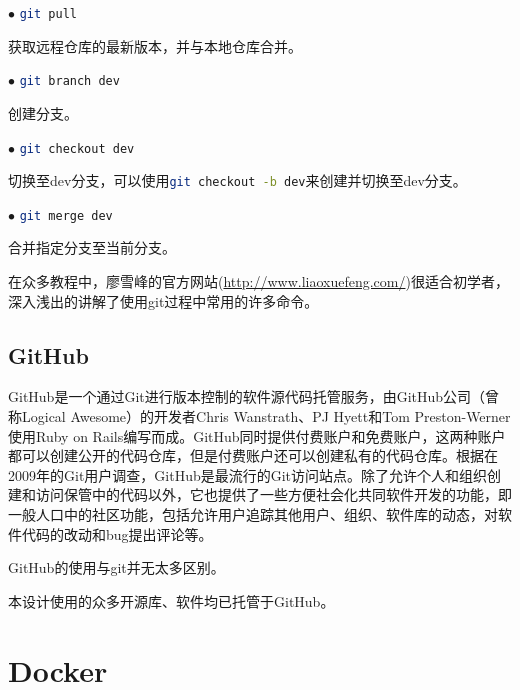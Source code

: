 			\par $\bullet$ \lstinline[language=sh]{git pull}
			\par 获取远程仓库的最新版本，并与本地仓库合并。
			\par $\bullet$ \lstinline[language=sh]{git branch dev}
			\par 创建分支。
			\par $\bullet$ \lstinline[language=sh]{git checkout dev}
			\par 切换至dev分支，可以使用\lstinline[language=sh]{git checkout -b dev}来创建并切换至dev分支。
			\par $\bullet$ \lstinline[language=sh]{git merge dev}
			\par 合并指定分支至当前分支。
			\par 在众多教程中，廖雪峰的官方网站(\href{http://www.liaoxuefeng.com/}{http://www.liaoxuefeng.com/})很适合初学者，深入浅出的讲解了使用git过程中常用的许多命令。
		\subsection{GitHub}
			\par GitHub是一个通过Git进行版本控制的软件源代码托管服务，由GitHub公司（曾称Logical Awesome）的开发者Chris Wanstrath、PJ Hyett和Tom Preston-Werner使用Ruby on Rails编写而成。GitHub同时提供付费账户和免费账户，这两种账户都可以创建公开的代码仓库，但是付费账户还可以创建私有的代码仓库。根据在2009年的Git用户调查，GitHub是最流行的Git访问站点。除了允许个人和组织创建和访问保管中的代码以外，它也提供了一些方便社会化共同软件开发的功能，即一般人口中的社区功能，包括允许用户追踪其他用户、组织、软件库的动态，对软件代码的改动和bug提出评论等。
			\par GitHub的使用与git并无太多区别。
			\par 本设计使用的众多开源库、软件均已托管于GitHub。
	\section{Docker}
